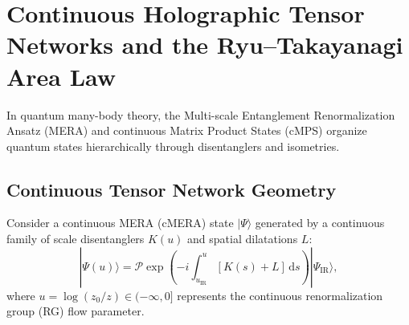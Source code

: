 \documentclass[11pt,a4paper,reqno]{amsart}
\theoremstyle{definition}
\numberwithin{equation}{section}
\newcommand{\dif}{\,\mathrm{d}}
\begin{document}
\section{Continuous Holographic Tensor Networks and the Ryu--Takayanagi Area Law}
\label{sec:ryu_takayanagi}

In quantum many-body theory, the Multi-scale Entanglement Renormalization Ansatz (MERA) and continuous Matrix Product States (cMPS) organize quantum states hierarchically through disentanglers and isometries.

\begin{figure}[htbp]
\centering
\begin{minipage}{0.95\textwidth}
\centering
{}
\end{minipage}
\end{figure}

\subsection{Continuous Tensor Network Geometry}
Consider a continuous MERA (cMERA) state $|\Psi\rangle$ generated by a continuous family of scale disentanglers $K(u)$ and spatial dilatations $L$:
\begin{equation}
    \label{eq:cmera_state}
    |\Psi(u)\rangle = \mathcal{P} \exp\left( -i \int_{u_{\mathrm{IR}}}^u [K(s) + L] \dif s \right) |\Psi_{\mathrm{IR}}\rangle,
\end{equation}
where $u = \log(z_0 / z) \in (-\infty, 0]$ represents the continuous renormalization group (RG) flow parameter.
\end{document}
